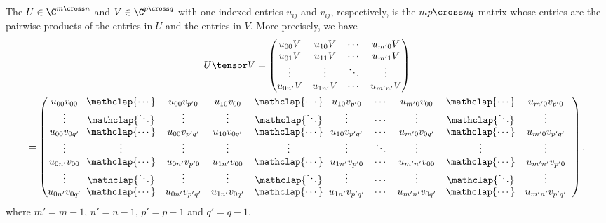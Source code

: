 \begin{definition}[Tensor product]
  \def\icdots{\mathclap{\cdots}}
  \def\iddots{\mathclap{\ddots}}
  The  $U \in \C^{m \cross n}$ and $V \in \C^{p
  \cross q}$ with one-indexed\footnotemark{} entries $u_{ij}$ and $v_{ij}$,
  respectively, is the $mp \cross nq$ matrix whose entries are the pairwise
  products of the entries in $U$ and the entries in $V$.  More precisely, we
  have 
  \begin{gather*}
    U \tensor V =
    \begin{pmatrix}
      u_{00}V & u_{10}V & \cdots & u_{m'0}V \\
      u_{01}V & u_{11}V & \cdots & u_{m'1}V \\
      \vdots & \vdots & \ddots & \vdots \\
      u_{0n'}V & u_{1n'}V & \cdots & u_{m'n'}V
    \end{pmatrix} \\ =
    \left(\begin{array}{@{}*{2}{c@{\;\;}ccc}cc@{\;\;}ccc@{}}
      u_{00}v_{00} & \icdots & u_{00}v_{p'0} &
      u_{10}v_{00} & \icdots & u_{10}v_{p'0} &
      \cdots &
      u_{m'0}v_{00} & \icdots & u_{m'0}v_{p'0}
      \\
      \vdots & \iddots & \vdots &
      \vdots & \iddots & \vdots &
      \cdots &
      \vdots & \iddots & \vdots
      \\
      u_{00}v_{0q'} & \icdots & u_{00}v_{p'q'} &
      u_{10}v_{0q'} & \icdots & u_{10}v_{p'q'} &
      \cdots &
      u_{m'0}v_{0q'} & \icdots & u_{m'0}v_{p'q'}
      \\
      \vdots & \vdots & \vdots &
      \vdots & \vdots & \vdots &
      \ddots &
      \vdots & \vdots & \vdots
      \\
      u_{0n'}v_{00} & \icdots & u_{0n'}v_{p'0} &
      u_{1n'}v_{00} & \icdots & u_{1n'}v_{p'0} &
      \cdots &
      u_{m'n'}v_{00} & \icdots & u_{m'n'}v_{p'0}
      \\
      \vdots & \iddots & \vdots &
      \vdots & \iddots & \vdots &
      \cdots &
      \vdots & \iddots & \vdots
      \\
      u_{0n'}v_{0q'} & \icdots & u_{0n'}v_{p'q'} &
      u_{1n'}v_{0q'} & \icdots & u_{1n'}v_{p'q'} &
      \cdots &
      u_{m'n'}v_{0q'} & \icdots & u_{m'n'}v_{p'q'}
    \end{array}\right).%
  \end{gather*}
  where $m'=m-1$, $n'=n-1$, $p'=p-1$ and $q'=q-1$.

\end{definition}

